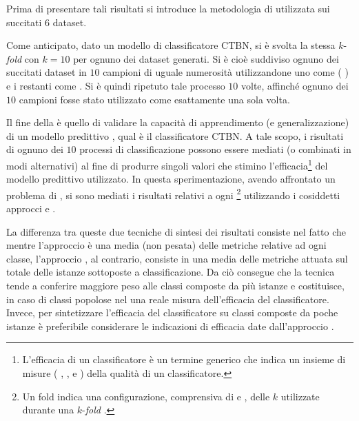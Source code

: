 Prima di presentare tali risultati si introduce la metodologia di  utilizzata sui succitati $6$ dataset.

Come anticipato, dato un modello di classificatore \acs{CTBN}, si è svolta la stessa $k$-\emph{fold } con $k = 10$ per ognuno dei dataset generati. Si è cioè suddiviso ognuno dei succitati dataset in $10$ campioni di uguale numerosità utilizzandone uno come \emph{} (\ie{} \emph{}) e i restanti come \emph{}. Si è quindi ripetuto tale processo $10$ volte, affinché ognuno dei $10$ campioni fosse stato utilizzato come \emph{} esattamente una sola volta.

Il fine della \emph{} è quello di validare la capacità di apprendimento (e generalizzazione) di un modello predittivo \citep[si veda][capitolo $7$]{Hastie2001}, qual è il classificatore \acs{CTBN}. A tale scopo, i risultati di ognuno dei $10$ processi di classificazione possono essere mediati (o combinati in modi alternativi) al fine di produrre singoli valori che stimino l'efficacia\footnote{L'efficacia di un classificatore è un termine generico che indica un insieme di misure (\eg{} \emph{}, \emph{}, \emph{} e \emph{}) della qualità di un classificatore.} del modello predittivo utilizzato. In questa sperimentazione, avendo affrontato un problema di \emph{}, si sono mediati i risultati relativi a ogni \emph{}\footnote{Un fold indica una configurazione, comprensiva di \emph{} e \emph{}, delle $k$ utilizzate durante una $k$-\emph{fold }.} utilizzando i cosiddetti approcci \emph{} e \emph{}.

La differenza tra queste due tecniche di sintesi dei risultati consiste nel fatto che mentre l'approccio \emph{} è una media (non pesata) delle metriche relative ad ogni classe, l'approccio \emph{}, al contrario, consiste in una media delle metriche attuata sul totale delle istanze sottoposte a classificazione. Da ciò consegue che la tecnica \emph{} tende a conferire maggiore peso alle classi composte da più istanze e costituisce, in caso di classi popolose nel \emph{} una reale misura dell'efficacia del classificatore. Invece, per sintetizzare l'efficacia del classificatore su classi composte da poche istanze è preferibile considerare le indicazioni di efficacia date dall'approccio \emph{} \citep[si veda][sezione 13.6]{Manning2008}.

